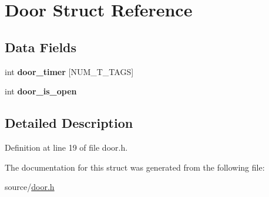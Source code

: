 \hypertarget{structDoor}{}\section{Door Struct Reference}
\label{structDoor}
\subsection*{Data Fields}
\begin{DoxyCompactItemize}
\item 
int {\bfseries door\+\_\+timer} \mbox{[}N\+U\+M\+\_\+\+T\+\_\+\+T\+A\+GS\mbox{]}\hypertarget{structDoor_aa5e2ba489f890ed656ac936513fd90fb}{}\label{structDoor_aa5e2ba489f890ed656ac936513fd90fb}

\item 
int {\bfseries door\+\_\+is\+\_\+open}\hypertarget{structDoor_a7e103b2e2527ecdead0dfd1f07366de9}{}\label{structDoor_a7e103b2e2527ecdead0dfd1f07366de9}

\end{DoxyCompactItemize}


\subsection{Detailed Description}


Definition at line 19 of file door.\+h.



The documentation for this struct was generated from the following file\+:\begin{DoxyCompactItemize}
\item 
source/\hyperlink{door_8h}{door.\+h}\end{DoxyCompactItemize}
